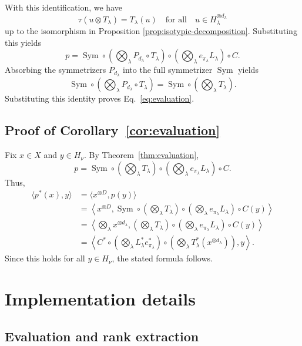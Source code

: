 \documentclass[11pt]{article}
\newcommand{\Sym}{\operatorname{Sym}}
\theoremstyle{definition}
\begin{document}
With this identification, we have
\[
  \tau(u\otimes T_\lambda)=T_\lambda(u)
  \quad
  \text{for all}
  \quad
  u\in H_\lambda^{\otimes d_\lambda}
\]
up to the isomorphism in Proposition \ref{prop:isotypic-decomposition}.
Substituting this yields
\[
  p
  =
  \Sym
  \circ
  \left(\bigotimes_\lambda P_{d_\lambda}\circ T_\lambda\right)
  \circ
  \left(\bigotimes_\lambda e_{\pi_\lambda}L_\lambda\right)
  \circ
  C.
\]
Absorbing the symmetrizers $P_{d_\lambda}$ into the full symmetrizer $\Sym$ yields
\[
  \Sym
  \circ
  \left(\bigotimes_\lambda P_{d_\lambda}\circ T_\lambda\right)
  =
  \Sym
  \circ
  \left(\bigotimes_\lambda T_\lambda\right).
\]
Substituting this identity proves Eq.~\eqref{eq:evaluation}.

\subsection{Proof of Corollary~\ref{cor:evaluation}}\label{sec:proof-corollary-evaluation}

Fix $x\in X$ and $y\in H_\nu$.
By Theorem~\ref{thm:evaluation},
\[
  p
  =
  \Sym
  \circ
  \left(\bigotimes_\lambda T_\lambda\right)
  \circ
  \left(\bigotimes_\lambda e_{\pi_\lambda}L_\lambda\right)
  \circ
  C.
\]
Thus,
\begin{align*}
  \langle p^*(x),y\rangle
  &=
  \langle x^{\otimes D},p(y)\rangle \\
  &=
  \left\langle
  x^{\otimes D},
  \Sym
  \circ
  \left(\bigotimes_\lambda T_\lambda\right)
  \circ
  \left(\bigotimes_\lambda e_{\pi_\lambda}L_\lambda\right)
  \circ
  C(y)
  \right\rangle \\
  &=
  \left\langle
  \bigotimes_\lambda x^{\otimes d_\lambda},
  \left(\bigotimes_\lambda T_\lambda\right)
  \circ
  \left(\bigotimes_\lambda e_{\pi_\lambda}L_\lambda\right)
  \circ
  C(y)
  \right\rangle \\
  &=
  \left\langle
  C^*
  \circ
  \left(\bigotimes_\lambda L_\lambda^*e_{\pi_\lambda}^*\right)
  \circ
  \left(\bigotimes_\lambda T_\lambda^*(x^{\otimes d_\lambda})\right),
  y
  \right\rangle.
\end{align*}
Since this holds for all $y\in H_\nu$, the stated formula follows.

\section{Implementation details}
\label{sec:appendix-implementation}

\subsection{Evaluation and rank extraction}
\end{document}
